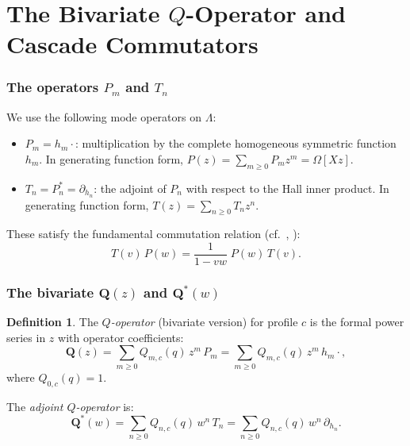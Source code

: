 \documentclass[11pt]{article}
\newcommand{\La}{\Lambda}
\theoremstyle{plain}
\theoremstyle{definition}
\newtheorem{definition}[theorem]{Definition}
\begin{document}
\part{The Bivariate $Q$-Operator and Cascade Commutators}


\section{The operators $P_m$ and $T_n$}
\label{sec:PT}

We use the following mode operators on $\La$:
\begin{itemize}
  \item $P_m = h_m \cdot{}$: multiplication by the complete
    homogeneous symmetric function $h_m$.  In generating function
    form, $P(z) = \sum_{m \geq 0} P_m z^m = \Omega[Xz]$.
  \item $T_n = P_n^* = \partial_{h_n}$: the adjoint of $P_n$ with
    respect to the Hall inner product.  In generating function form,
    $T(z) = \sum_{n \geq 0} T_n z^n$.
\end{itemize}

These satisfy the fundamental commutation relation
(cf.~\cite{langer-masters}, \cite{COMMUTATION}):
\begin{equation}\label{eq:fund-comm}
  T(v)\, P(w) = \frac{1}{1 - vw}\; P(w)\, T(v).
\end{equation}


\section{The bivariate $\mathbf{Q}(z)$ and $\mathbf{Q}^*(w)$}
\label{sec:Q-bivariate}

\begin{definition}\label{def:Q-bi}
The \emph{$Q$-operator} (bivariate version) for profile $c$ is the
formal power series in $z$ with operator coefficients:
\begin{equation}\label{eq:Q-bi}
  \mathbf{Q}(z)
  = \sum_{m \geq 0} Q_{m,c}(q)\, z^m\, P_m
  = \sum_{m \geq 0} Q_{m,c}(q)\, z^m\, h_m \cdot{},
\end{equation}
where $Q_{0,c}(q) = 1$.

The \emph{adjoint $Q$-operator} is:
\begin{equation}\label{eq:Qstar-bi}
  \mathbf{Q}^*(w)
  = \sum_{n \geq 0} Q_{n,c}(q)\, w^n\, T_n
  = \sum_{n \geq 0} Q_{n,c}(q)\, w^n\, \partial_{h_n}.
\end{equation}
\end{definition}
\end{document}
